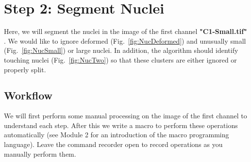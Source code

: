 \section{Step 2: Segment Nuclei}

Here, we will segment the nuclei in the image of the first channel \textbf{"C1-Small.tif"} . We would like to ignore deformed (Fig.~\ref{fig:NucDeformed}) and unusually small (Fig.~\ref{fig:NucSmall}) or large nuclei. In addition, the algorithm should identify touching nuclei (Fig.~\ref{fig:NucTwo}) so that these clusters are either ignored or properly split.

\subsection{Workflow}

We will first perform some manual processing on the image of the first channel to understand each step. After this we write a macro to perform these operations automatically (see Module 2 for an introduction of the macro programming language). Leave the command recorder open to record operations as you manually perform them.

